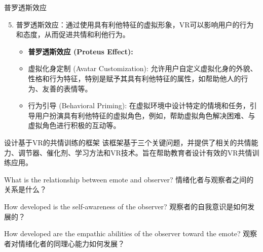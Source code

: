 \documentclass[aspectratio=169,xcolor=dvipsnames]{beamer}
\begin{document}
\begin{frame}{普罗透斯效应}
    \begin{enumerate}
        \setcounter{enumi}{4}
        \item 普罗透斯效应：通过使用具有利他特征的虚拟形象，VR可以影响用户的行为和态度，从而促进共情和利他行为。
        \begin{itemize}
            \item \textbf{普罗透斯效应 (Proteus Effect):}
            \item 虚拟化身定制 (Avatar Customization): 允许用户自定义虚拟化身的外貌、性格和行为特征，特别是赋予其具有利他特征的属性，如帮助他人的行为、友善的表情等。
            \item 行为引导 (Behavioral Priming): 在虚拟环境中设计特定的情境和任务，引导用户扮演具有利他特征的虚拟角色，例如，帮助虚拟角色解决困难、与虚拟角色进行积极的互动等。
        \end{itemize}
    \end{enumerate}
    
    \vspace{5mm}
    
\end{frame}
 \begin{frame}{设计基于VR的共情训练的框架 }
    该框架基于三个关键问题，并提供了相关的共情能力、调节器、催化剂、学习方法和VR技术。旨在帮助教育者设计有效的VR共情训练应用。
     \begin{block}{What is the relationship between emote and observer?}
        情绪化者与观察者之间的关系是什么？
     \end{block}

     \begin{alertblock}{How developed is the self-awareness of the observer?}
     观察者的自我意识是如何发展的？
      \end{alertblock}

     \begin{block}{How developed are the empathic abilities of the observer toward the emote?}
     观察者对情绪化者的同理心能力如何发展？
      \end{block}
     
          
 \end{frame}
 
\end{document}

